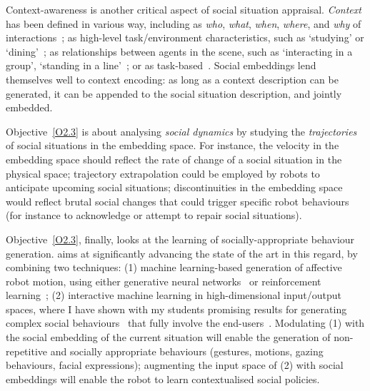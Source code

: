 Context-awareness is another critical aspect of social situation appraisal.
\emph{Context} has been defined in various way, including as \emph{who},
\emph{what}, \emph{when}, \emph{where}, and \emph{why} of
interactions~\cite{vinciarelli2009social}; as high-level task/environment
characteristics, such as `studying' or `dining'~\cite{nigam2015social}; as
relationships between agents in the scene, such as `interacting in a group',
`standing in a line'~\cite{althaus2004navigation}; or as
task-based~\cite{castellano2012detecting}. Social embeddings lend themselves
well to context encoding: as long as a context description can be generated, it
can be appended to the social situation description, and jointly embedded.



Objective~\ref{O2.3} is about analysing \emph{social dynamics} by
studying the \emph{trajectories} of social situations in the embedding space.
For instance, the velocity in the embedding space should reflect the rate of
change of a social situation in the physical space; trajectory extrapolation
could be employed by robots to anticipate upcoming social situations;
discontinuities in the embedding space would reflect brutal social changes that
could trigger specific robot behaviours (for instance to acknowledge or attempt
to repair social situations).

Objective~\ref{O2.3}, finally, looks at the learning of socially-appropriate
behaviour generation. \project aims at significantly advancing the state of the
art in this regard, by combining two techniques: (1) machine learning-based
generation of affective robot motion, using either generative neural
networks~\cite{marmpena2019generating,suguitan2020moveae} or reinforcement
learning~; (2) interactive machine learning in high-dimensional
input/output spaces, where I have shown with my students promising results for
generating complex social behaviours~\cite{senft2019teaching, winkle2020couch}
that fully involve the end-users~\cite{winkle2018social}. Modulating (1) with
the social embedding of the current situation will enable the generation of
non-repetitive and socially appropriate behaviours (gestures, motions, gazing
behaviours, facial expressions); augmenting the input space of (2) with social
embeddings will enable the robot to learn contextualised social policies.


